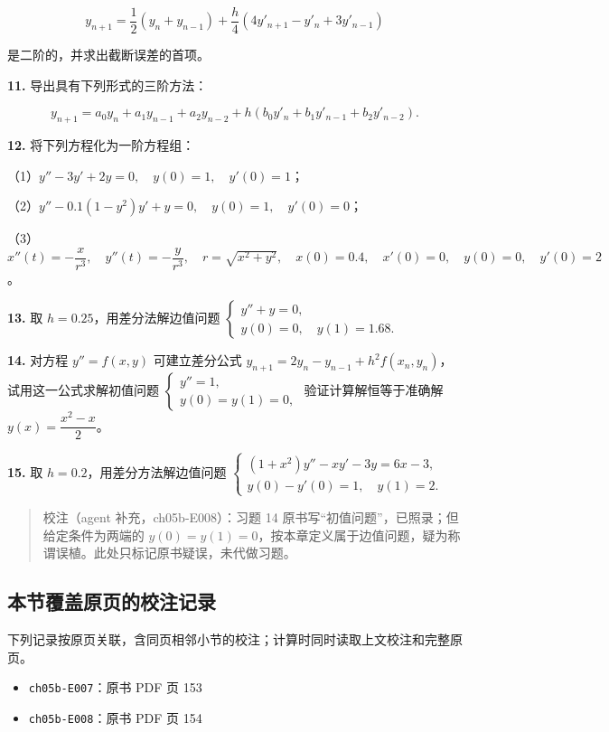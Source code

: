 \documentclass[
  10pt,
  fontset=fandol]{ctexart}
\providecommand{\tightlist}{%
  \setlength{\itemsep}{0pt}\setlength{\parskip}{0pt}}
\begin{document}
\[
y_{n+1}=\frac12(y_n+y_{n-1})+\frac h4(4y'_{n+1}-y'_n+3y'_{n-1})
\]

是二阶的，并求出截断误差的首项。

\textbf{11.} 导出具有下列形式的三阶方法：

\[
y_{n+1}=a_0y_n+a_1y_{n-1}+a_2y_{n-2}+h(b_0y'_n+b_1y'_{n-1}+b_2y'_{n-2}).
\]

\textbf{12.} 将下列方程化为一阶方程组：

（1）\(y''-3y'+2y=0,\quad y(0)=1,\quad y'(0)=1\)；

（2）\(y''-0.1(1-y^2)y'+y=0,\quad y(0)=1,\quad y'(0)=0\)；

（3）\(x''(t)=-\dfrac{x}{r^3},\allowbreak \quad y''(t)=-\dfrac{y}{r^3},\allowbreak \quad r=\sqrt{x^2+y^2},\allowbreak \quad x(0)=0.4,\allowbreak \quad x'(0)=0,\allowbreak \quad y(0)=0,\allowbreak \quad y'(0)=2\)。

\textbf{13.} 取 \(h=0.25\)，用差分法解边值问题 \(\begin{cases}y''+y=0,\\y(0)=0,\quad y(1)=1.68.\end{cases}\)

\textbf{14.} 对方程 \(y''=f(x,y)\) 可建立差分公式 \(y_{n+1}=2y_n-y_{n-1}+h^2f(x_n,y_n)\)，试用这一公式求解初值问题 \(\begin{cases}y''=1,\\y(0)=y(1)=0,\end{cases}\) 验证计算解恒等于准确解 \(y(x)=\dfrac{x^2-x}{2}\)。

\textbf{15.} 取 \(h=0.2\)，用差分方法解边值问题 \(\begin{cases}(1+x^2)y''-xy'-3y=6x-3,\\y(0)-y'(0)=1,\quad y(1)=2.\end{cases}\)

\begin{quote}
校注（agent 补充，ch05b-E008）：习题 14 原书写``初值问题''，已照录；但给定条件为两端的 \(y(0)=y(1)=0\)，按本章定义属于边值问题，疑为称谓误植。此处只标记原书疑误，未代做习题。
\end{quote}

\subsection{本节覆盖原页的校注记录}\label{ux672cux8282ux8986ux76d6ux539fux9875ux7684ux6821ux6ce8ux8bb0ux5f55}

下列记录按原页关联，含同页相邻小节的校注；计算时同时读取上文校注和完整原页。

\begin{itemize}
\tightlist
\item
  \texttt{ch05b-E007}：原书 PDF 页 153
\item
  \texttt{ch05b-E008}：原书 PDF 页 154
\end{itemize}
\end{document}
